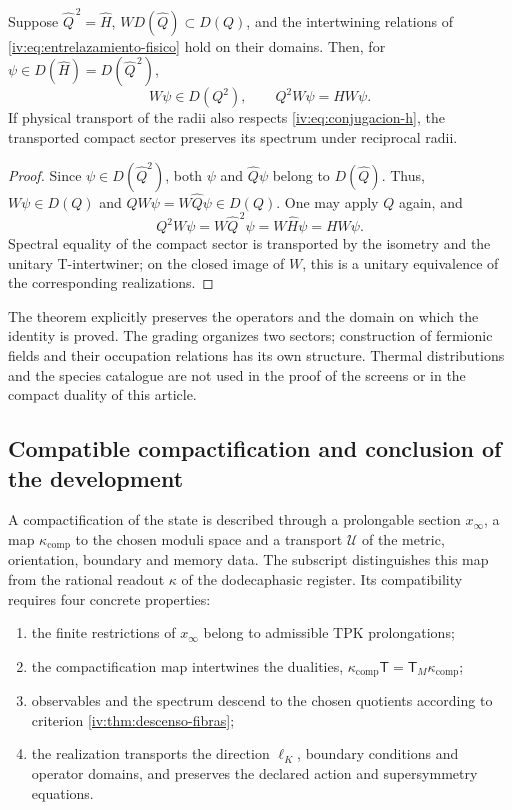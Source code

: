 \begin{theorem}
\label{iv:thm:supercarga-transporte}
Suppose \(\widehat Q^{\,2}=\widehat H\),
\(W D(\widehat Q)\subset D(Q)\), and the
intertwining relations of \eqref{iv:eq:entrelazamiento-fisico}
hold on their domains. Then, for
\(\psi\in D(\widehat H)=D(\widehat Q^{\,2})\),
\[
 W\psi\in D(Q^2),\qquad Q^2W\psi=HW\psi.
\]
If physical transport of the radii also respects
\eqref{iv:eq:conjugacion-h}, the transported compact
sector preserves its spectrum under reciprocal radii.
\end{theorem}
\begin{proof}
Since \(\psi\in D(\widehat Q^2)\), both
\(\psi\) and \(\widehat Q\psi\) belong
to \(D(\widehat Q)\). Thus, \(W\psi\in D(Q)\)
and \(QW\psi=W\widehat Q\psi\in D(Q)\). One may
apply \(Q\) again, and
\[
 Q^2W\psi=W\widehat Q^{\,2}\psi
          =W\widehat H\psi=HW\psi.
\]
Spectral equality of the compact sector is transported
by the isometry and the unitary T-intertwiner;
on the closed image of \(W\), this is a
unitary equivalence of the corresponding realizations.
\end{proof}

The theorem explicitly preserves the operators and the
domain on which the identity is proved. The
grading organizes two sectors; construction of
fermionic fields and their occupation relations has
its own structure. Thermal distributions and the
species catalogue are not used in the proof
of the screens or in the compact duality of this
article.

\subsection{Compatible compactification and conclusion of the development}

A compactification of the state is described through
a prolongable section \(x_\infty\), a map
\(\kappa_{\mathrm{comp}}\) to the chosen moduli
space and a transport \(\mathcal U\) of the
metric, orientation, boundary and memory data. The
subscript distinguishes this map from the rational readout
\(\kappa\) of the dodecaphasic register. Its compatibility
requires four concrete properties:
\begin{enumerate}
\item the finite restrictions of \(x_\infty\)
      belong to admissible TPK prolongations;
\item the compactification map intertwines the dualities,
      \(\kappa_{\mathrm{comp}}\mathsf T
        =\mathsf T_M\kappa_{\mathrm{comp}}\);
\item observables and the spectrum descend to the
      chosen quotients according to criterion
      \ref{iv:thm:descenso-fibras};
\item the realization transports the direction
      \(\ell_K\), boundary conditions and operator
      domains, and preserves the declared action
      and supersymmetry equations.
\end{enumerate}


